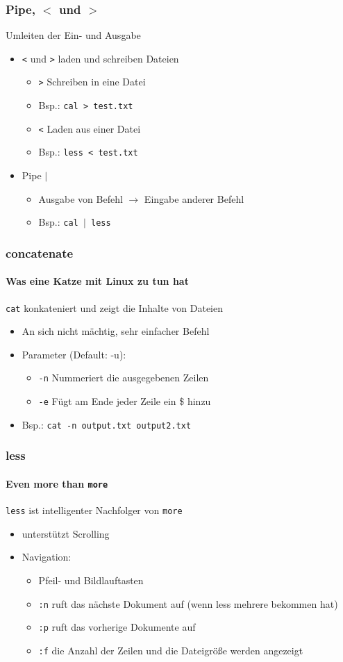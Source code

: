 \documentclass[12pt,utf8]{beamer}
\begin{document}
\begin{frame}
\frametitle{Pipe, $<$ und $>$ }
Umleiten der Ein- und Ausgabe
\begin{itemize}
	\item \texttt{<} und \texttt{>} laden und schreiben Dateien
	\begin{itemize}[<+->]
		\item \texttt{>} Schreiben in eine Datei
		\item Bsp.: \texttt{cal > test.txt}
		\item \texttt{<} Laden aus einer Datei
		\item Bsp.: \texttt{less < test.txt}
	\end{itemize}
	\item Pipe \texttt{$\mid$}
	\begin{itemize}[<+->]
		\item Ausgabe von Befehl $\to$ Eingabe anderer Befehl
		\item Bsp.: \texttt{cal $\mid$ less}
	\end{itemize}
\end{itemize}
\end{frame}

\begin{frame}
	\frametitle{concatenate}
	\framesubtitle{Was eine Katze mit Linux zu tun hat}
	\texttt{cat} konkateniert und zeigt die Inhalte von Dateien
	\begin{itemize}
		\item An sich nicht mächtig, sehr einfacher Befehl
		\item Parameter (Default: -u):
		\begin{itemize}[<+->]
			\item \texttt{-n} Nummeriert die ausgegebenen Zeilen 
			\item \texttt{-e} Fügt am Ende jeder Zeile ein \$ hinzu
		\end{itemize}
		\item Bsp.: \texttt{cat -n output.txt output2.txt}
	\end{itemize}
\end{frame}

\begin{frame}
\frametitle{less}
\framesubtitle{Even more than \texttt{more}}
\texttt{less} ist intelligenter Nachfolger von \texttt{more}
\begin{itemize}
	\item unterstützt Scrolling
	\item Navigation:
	\begin{itemize}[<+->]
		\item Pfeil- und Bildlauftasten
		\item \texttt{:n} ruft das nächste Dokument auf (wenn less mehrere bekommen hat)
		\item \texttt{:p} ruft das vorherige Dokumente auf
		\item \texttt{:f} die Anzahl der Zeilen und die Dateigröße werden angezeigt
	\end{itemize}
\end{itemize}
\end{frame}
\end{document}
